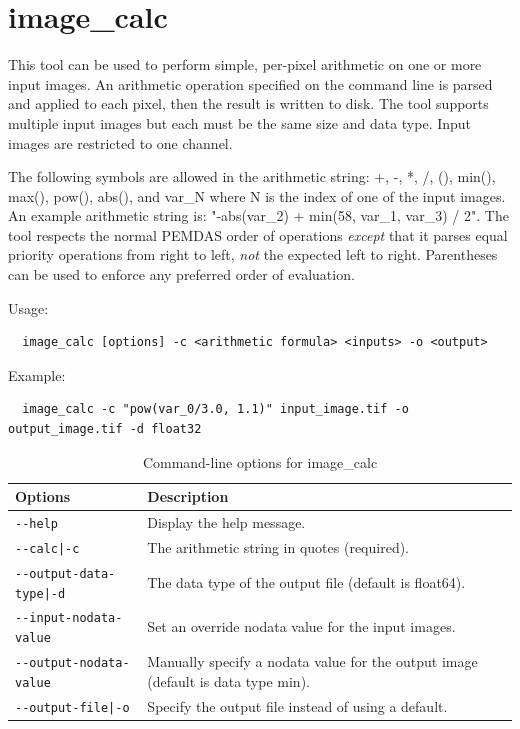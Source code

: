 \section{image\_calc}
\label{imagecalc}

This tool can be used to perform simple, per-pixel arithmetic on one or more
input images. An arithmetic operation specified on the command line is parsed
and applied to each pixel, then the result is written to disk. The tool
supports multiple input images but each must be the same size and data type.
Input images are restricted to one channel.

The following symbols are allowed in the arithmetic string: +, -, *, /,
(), min(), max(), pow(), abs(), and var\_N where N is the index of one
of the input images. An example arithmetic string is: "-abs(var\_2) +
min(58, var\_1, var\_3) / 2".  The tool respects the normal PEMDAS order
of operations \textit{except} that it parses equal priority operations
from right to left, \textit{not} the expected left to right.
Parentheses can be used to enforce any preferred order of evaluation.


\medskip

Usage:
\begin{verbatim}
  image_calc [options] -c <arithmetic formula> <inputs> -o <output>
\end{verbatim}

Example:
\begin{verbatim}
  image_calc -c "pow(var_0/3.0, 1.1)" input_image.tif -o output_image.tif -d float32
\end{verbatim}

\medskip

\begin{longtable}{|l|p{10cm}|}
\caption{Command-line options for image\_calc}
\label{tbl:imagecalc}
\endfirsthead
\endhead
\endfoot
\endlastfoot
\hline
Options & Description \\ \hline \hline
\texttt{-\/-help} & Display the help message.\\ \hline
\texttt{-\/-calc|-c} & The arithmetic string in quotes (required).\\ \hline
\texttt{-\/-output-data-type|-d} & The data type of the output file (default is float64).\\ \hline
\texttt{-\/-input-nodata-value} & Set an override nodata value for the input images.\\ \hline
\texttt{-\/-output-nodata-value} & Manually specify a nodata value for the output image (default is data type min).\\ \hline
\texttt{-\/-output-file|-o} & Specify the output file instead of using a default.\\ \hline
\end{longtable}


